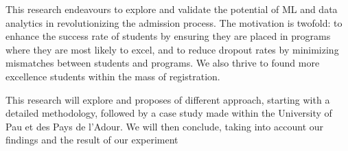 \documentclass[../main.tex]{subfiles}
\begin{document}
This research endeavours to explore and validate the potential of ML and data analytics in revolutionizing the admission process. The motivation is twofold: to enhance the success rate of students by ensuring they are placed in programs where they are most likely to excel, and to reduce dropout rates by minimizing mismatches between students and programs. We also thrive to found more excellence students within the mass of registration.

This research will explore and proposes of different approach, starting with a detailed methodology, followed by a case study made within the University of Pau et des Pays de l'Adour. 
We will then conclude, taking into account our findings and the result of our experiment 
\end{document}
